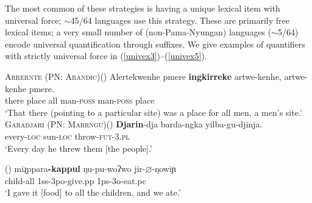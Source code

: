 \documentclass[12pt,egregdoesnotlikesansseriftitles]{scrartcl}
\begin{document}
The most common of these strategies is having a unique lexical item with universal force; $\sim$45/64 languages use this strategy. These are primarily free lexical items; a very small number of (non-Pama-Nyungan) languages ($\sim$5/64) encode universal quantification  through suffixes. We give examples of quantifiers with strictly universal force in (\ref{univex3})--(\ref{univex5}).

\begin{exe}
  \ex  \textsc{Arrernte (PN: Arandic)}\hfill (\citealt[132]{wilkins89})
  \gll Alertekwenhe pmere \textbf{ingkirreke} artwe-kenhe, artwe-kenhe pmere.\\
  there place all man-\textsc{poss} man-\textsc{poss} place\\
  \glt `That there (pointing to a particular site) was a place for all men, a men's site.' \label{univex3}
  \ex  \textsc{Garadjari (PN: Marrngu)}\hfill (\citealt[48]{sands89}) 
  \gll \textbf{Djarin}-dja barda-ngka yilba-gu-djinja.\\
  every-\textsc{loc} sun-\textsc{loc}   throw-\textsc{fut}-3.\textsc{pl}\\
  \glt `Every day he threw them [the people].' \label{univex4}

    \hfill (\citealt[160]{baker08}) \label{univex5}
\gll  miɻppara\textbf{-kappul}   ŋu-pu-woʔwo      jir-$\varnothing$-ŋowiɲ\\
       child-all                   1{\sc ss-3po}-give.{\sc pp} 1{\sc ps-3o}-eat.{\sc pc} \\
         `I gave it [food] to all the children, and we ate.'
\end{exe}
\end{document}
